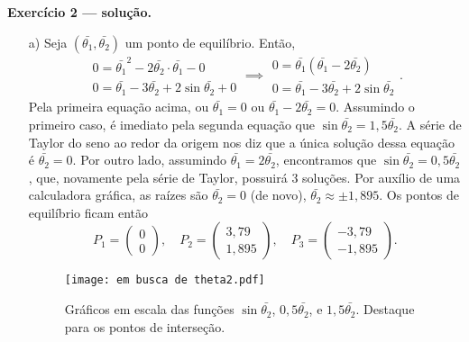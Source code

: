 \clearpage
\noindent
\textbf{\sffamily Exercício 2 --- solução.}
\begin{itemize}
	\item [a)] 
	Seja $(\bar{\theta_1}, \bar{\theta_2})$ um ponto de equilíbrio. Então,
	\[
	\begin{array}{l}
		0 = 
		\bar{\theta_1}^2 - 2\bar{\theta_2}\cdot \bar{\theta_1} - 0 \\
		0 = 
		\bar{\theta_1} -3\bar{\theta_2} + 2\sin\bar{\theta_2} + 0
	\end{array}
	\implies
	\begin{array}{l}
		0 = 
		\bar{\theta_1}(\bar{\theta_1} - 2\bar{\theta_2}) \\
		0 = 
		\bar{\theta_1} -3\bar{\theta_2} + 2\sin\bar{\theta_2}
	\end{array}.
	\]
	Pela primeira equação acima, ou 
	$\bar{\theta_1}=0$ ou 
	$\bar{\theta_1} - 2\bar{\theta_2}=0$.
	Assumindo o primeiro caso, é imediato pela segunda equação que 
	$\sin\bar{\theta_2}=1,5\bar{\theta_2}$. 
	A série de Taylor do seno ao redor da origem nos diz que a única solução dessa equação é $\bar{\theta_2}=0$. 
	Por outro lado, assumindo $\bar{\theta_1}=2\bar{\theta_2}$, encontramos que 
	$\sin\bar{\theta_2} = 0,5\bar{\theta_2}$, que, novamente pela série de Taylor, possuirá 3 soluções. 
	Por auxílio de uma calculadora gráfica, as raízes são 
	$\bar{\theta_2} = 0$ (de novo),
	$\bar{\theta_2} \approx \pm 1,895$.
	Os pontos de equilíbrio ficam então 
	\[
	P_1 = \begin{pmatrix} 0 \\ 0 \end{pmatrix}, \quad 
	P_2 = \begin{pmatrix} 3,79 \\ 1,895 \end{pmatrix}, \quad 
	P_3 = \begin{pmatrix} -3,79 \\ -1,895 \end{pmatrix}.
	\]
	\begin{figure}[h!]\centering
		\texttt{[image: em busca de theta2.pdf]}
		\caption{%
			Gráficos em escala das funções $\sin\bar{\theta_2}$, 
			$0,5\bar{\theta_2}$, e
			$1,5\bar{\theta_2}$.
			Destaque para os pontos de interseção.
		}
	\end{figure}
	

\end{itemize}
